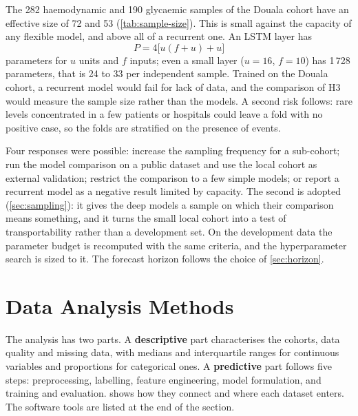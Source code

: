 The 282 haemodynamic and 190 glycaemic samples of the Douala cohort have an effective size of 72 and 53 (\cref{tab:sample-size}). This is small against the capacity of any flexible model, and above all of a recurrent one. An LSTM layer has
\begin{equation}
  P = 4\bigl[u(f+u) + u\bigr]
\end{equation}
parameters for $u$ units and $f$ inputs; even a small layer ($u = 16$, $f = 10$) has 1\,728 parameters, that is 24 to 33 per independent sample. Trained on the Douala cohort, a recurrent model would fail for lack of data, and the comparison of H3 would measure the sample size rather than the models. A second risk follows: rare levels concentrated in a few patients or hospitals could leave a fold with no positive case, so the folds are stratified on the presence of events.

Four responses were possible: increase the sampling frequency for a sub-cohort; run the model comparison on a public dataset and use the local cohort as external validation; restrict the comparison to a few simple models; or report a recurrent model as a negative result limited by capacity. The second is adopted (\cref{sec:sampling}): it gives the deep models a sample on which their comparison means something, and it turns the small local cohort into a test of transportability rather than a development set. On the development data the parameter budget is recomputed with the same criteria, and the hyperparameter search is sized to it. The forecast horizon follows the choice of \cref{sec:horizon}.

\section{Data Analysis Methods}\label{sec:analysis}

The analysis has two parts. A \textbf{descriptive} part characterises the cohorts, data quality and missing data, with medians and interquartile ranges for continuous variables and proportions for categorical ones. A \textbf{predictive} part follows five steps: preprocessing, labelling, feature engineering, model formulation, and training and evaluation.  shows how they connect and where each dataset enters. The software tools are listed at the end of the section.

